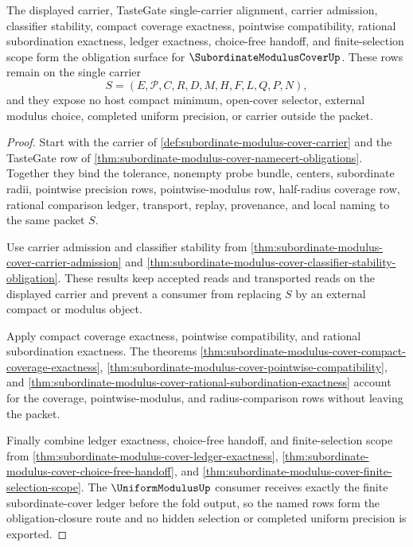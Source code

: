 \begin{theorem}
\label{thm:subordinate-modulus-cover-obligation-closure-route}
The displayed carrier, TasteGate single-carrier alignment, carrier admission, classifier stability, compact coverage exactness, pointwise compatibility, rational subordination exactness, ledger exactness, choice-free handoff, and finite-selection scope form the obligation surface for $\SubordinateModulusCoverUp$. These rows remain on the single carrier
$$
S=(E,\mathcal{P},C,R,D,M,H,F,L,Q,P,N),
$$
and they expose no host compact minimum, open-cover selector, external modulus choice, completed uniform precision, or carrier outside the packet.
\end{theorem}
\begin{proof}
Start with the carrier of \autoref{def:subordinate-modulus-cover-carrier} and the TasteGate row of \autoref{thm:subordinate-modulus-cover-namecert-obligations}. Together they bind the tolerance, nonempty probe bundle, centers, subordinate radii, pointwise precision rows, pointwise-modulus row, half-radius coverage row, rational comparison ledger, transport, replay, provenance, and local naming to the same packet $S$.

Use carrier admission and classifier stability from \autoref{thm:subordinate-modulus-cover-carrier-admission} and \autoref{thm:subordinate-modulus-cover-classifier-stability-obligation}. These results keep accepted reads and transported reads on the displayed carrier and prevent a consumer from replacing $S$ by an external compact or modulus object.

Apply compact coverage exactness, pointwise compatibility, and rational subordination exactness. The theorems \autoref{thm:subordinate-modulus-cover-compact-coverage-exactness}, \autoref{thm:subordinate-modulus-cover-pointwise-compatibility}, and \autoref{thm:subordinate-modulus-cover-rational-subordination-exactness} account for the coverage, pointwise-modulus, and radius-comparison rows without leaving the packet.

Finally combine ledger exactness, choice-free handoff, and finite-selection scope from \autoref{thm:subordinate-modulus-cover-ledger-exactness}, \autoref{thm:subordinate-modulus-cover-choice-free-handoff}, and \autoref{thm:subordinate-modulus-cover-finite-selection-scope}. The $\UniformModulusUp$ consumer receives exactly the finite subordinate-cover ledger before the fold output, so the named rows form the obligation-closure route and no hidden selection or completed uniform precision is exported.
\end{proof}

